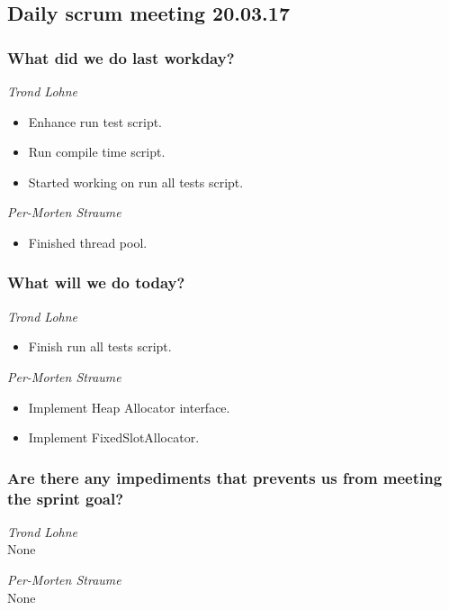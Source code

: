 \documentclass{article}
\begin{document}
\begin{center}
\subsection*{Daily scrum meeting 20.03.17}
\end{center}
\bigskip


\subsubsection*{What did we do last workday?}

\noindent\textit{Trond Lohne}
\begin{itemize}
	\item 
	Enhance run test script.
	
	\item 
	Run compile time script.
	
	\item 
	Started working on run all tests script.
\end{itemize}

\medskip

\noindent\textit{Per-Morten Straume}
\begin{itemize}
	\item 
	Finished thread pool.
\end{itemize}

\subsubsection*{What will we do today?}

\noindent\textit{Trond Lohne}
\begin{itemize}
	\item 
	Finish run all tests script.
\end{itemize}

\medskip

\noindent\textit{Per-Morten Straume}
\begin{itemize}
	\item 
	Implement Heap Allocator interface.
	
	\item 
	Implement FixedSlotAllocator.
\end{itemize}


\subsubsection*{Are there any impediments that prevents us from meeting the sprint goal?}

\noindent\textit{Trond Lohne}\\
None

\medskip

\noindent\textit{Per-Morten Straume}\\
None
\end{document}
